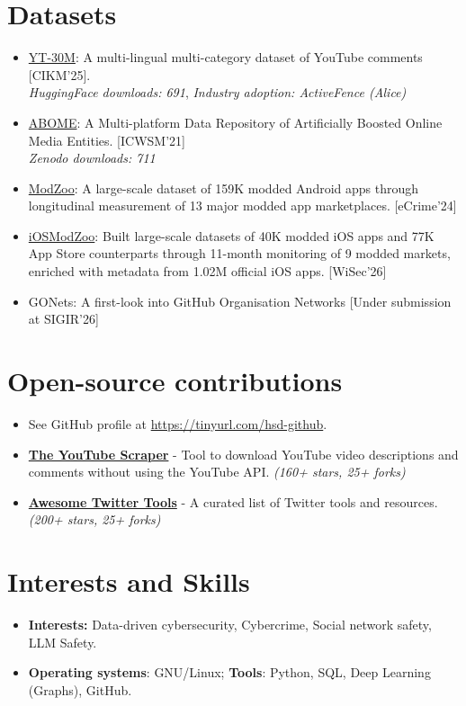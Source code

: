 \documentclass[margin, centered]{res}
\begin{document}
\begin{resume}
\section{Datasets}
\begin{itemize}[leftmargin=*]
\item  \href{https://huggingface.co/datasets/hridaydutta123/YT-100K}{YT-30M}: A multi-lingual multi-category dataset of YouTube comments [CIKM'25].\\
\textit{\small{HuggingFace downloads: 691}},
\textit{\small{Industry adoption: ActiveFence (Alice)}}
\item \href{https://zenodo.org/records/4437987}{ABOME}: A Multi-platform Data Repository of Artificially Boosted Online Media Entities. [ICWSM'21]\\
\textit{\small{Zenodo downloads: 711}}
\item \href{https://www.cambridgecybercrime.uk/datasets.html}{ModZoo}: A large-scale dataset of 159K modded Android apps through longitudinal measurement of 13 major modded app marketplaces. [eCrime'24]
\item \href{https://www.cambridgecybercrime.uk/datasets.html}{iOSModZoo}: Built large-scale datasets of 40K modded iOS apps and 77K App Store counterparts through 11-month monitoring of 9 modded markets, enriched with metadata from 1.02M official iOS apps. [WiSec'26]
\item GONets: A first-look into GitHub Organisation Networks [Under submission at SIGIR'26]
\end{itemize}
\section{Open-source contributions}
\begin{itemize}[leftmargin=*]
\item[] See GitHub profile at \url{https://tinyurl.com/hsd-github}.
\item \textbf{\href{https://github.com/hridaydutta123/the-youtube-scraper}{The YouTube Scraper}} - Tool to download YouTube video descriptions and comments without using the YouTube API. \textit{(160+ stars, 25+ forks)}
\item \textbf{\href{https://github.com/hridaydutta123/awesome-twitter-tools}{Awesome Twitter Tools}} - A curated list of Twitter tools  and resources. \textit{(200+ stars, 25+ forks)}

\end{itemize}
\section{Interests and Skills}
\begin{itemize}[leftmargin=*]
 \item[] \textbf{Interests:} Data-driven cybersecurity, Cybercrime,  Social network safety, LLM Safety.
 \item[] \textbf{Operating systems}: GNU/Linux; \textbf{Tools}: Python, SQL, Deep Learning (Graphs), GitHub.
\end{itemize}


\end{resume}
\end{document}

